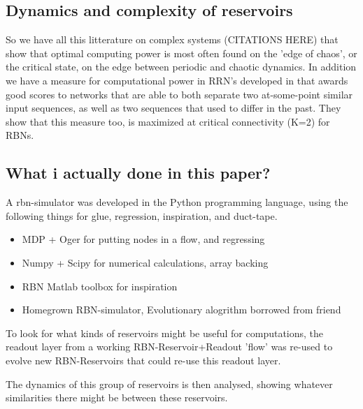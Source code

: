 \subsection{Dynamics and complexity of reservoirs}

So we have all this litterature on complex systems (CITATIONS HERE) that show that optimal computing power is most often found on the 'edge of chaos', or the critical state, on the edge between periodic and chaotic dynamics.
In addition we have a measure for computational power in RRN's developed in \cite{rbn-reservoir} that awards good scores to networks that are able to both separate two at-some-point similar input sequences, as well as two sequences that used to differ in the past.
They show that this measure too, is maximized at critical connectivity (K=2) for RBNs.

\subsection{What i actually done in this paper?}

A rbn-simulator was developed in the Python programming language,
using the following things for glue, regression, inspiration, and duct-tape.

\begin{itemize}
  \item MDP + Oger for putting nodes in a flow, and regressing
  \item Numpy + Scipy for numerical calculations, array backing
  \item RBN Matlab toolbox for inspiration
  \item Homegrown RBN-simulator, Evolutionary alogrithm borrowed from friend
\end{itemize}

To look for what kinds of reservoirs might be useful for computations,
the readout layer from a working RBN-Reservoir+Readout 'flow' was re-used to evolve new RBN-Reservoirs that could re-use this readout layer.

The dynamics of this group of reservoirs is then analysed,
showing whatever similarities there might be between these reservoirs.
